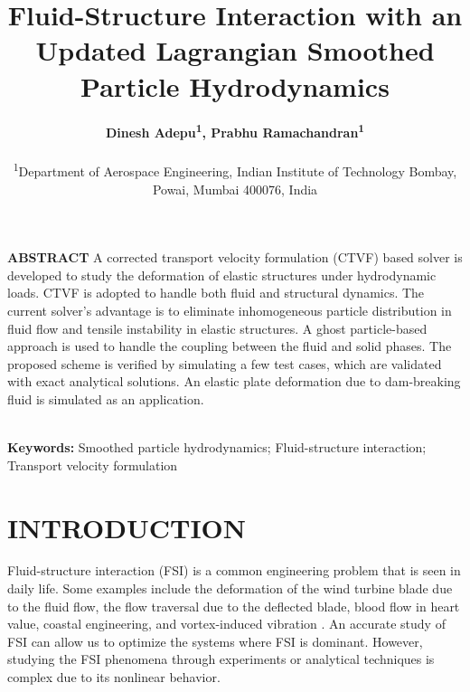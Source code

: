 \documentclass[10pt, conference]{FMFP2022}
\begin{document}
\title{\LARGE{ \bf Fluid-Structure Interaction with an Updated
    Lagrangian Smoothed Particle Hydrodynamics }}
\author{\textbf{Dinesh Adepu\textsuperscript{1}, Prabhu Ramachandran\textsuperscript{1}}\\\\
  \textsuperscript{1}\small{Department of Aerospace Engineering, Indian
    Institute of Technology Bombay, Powai, Mumbai 400076, India}}

\maketitle
\thispagestyle{fancy}
\pagestyle{plain} %

\noindent \textbf{ABSTRACT}
A corrected transport velocity formulation (CTVF) based solver is developed to
study the deformation of elastic structures under hydrodynamic loads. CTVF is
adopted to handle both fluid and structural dynamics. The current solver’s
advantage is to eliminate inhomogeneous particle distribution in fluid flow and
tensile instability in elastic structures. A ghost particle-based approach is
used to handle the coupling between the fluid and solid phases. The proposed
scheme is verified by simulating a few test cases, which are validated with exact
analytical solutions. An elastic plate deformation due to dam-breaking fluid
is simulated as an application.


\noindent\\
\textbf{Keywords:} Smoothed particle hydrodynamics; Fluid-structure interaction; Transport velocity formulation \\

\section{{\textbf{INTRODUCTION}}}
Fluid-structure interaction (FSI) is a common engineering problem that is seen
in daily life. Some examples include the deformation of the wind turbine blade
due to the fluid flow, the flow traversal due to the deflected blade, blood flow
in heart value, coastal engineering, and vortex-induced vibration
\cite{williamson2004vortex,bearman2011circular}. An accurate study of FSI can
allow us to optimize the systems where FSI is dominant. However, studying the
FSI phenomena through experiments or analytical techniques is complex due to its
nonlinear behavior. %
\end{document}
